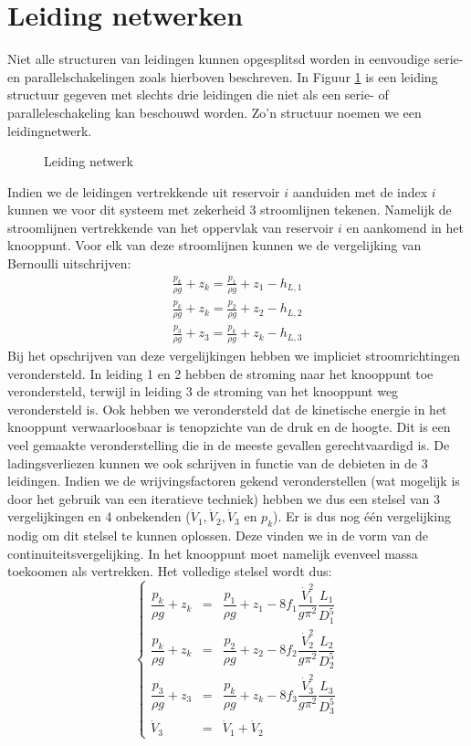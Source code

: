 	\FloatBarrier
	\section{Leiding netwerken}
	\label{sec:Leiding netwerken}	
Niet alle structuren van leidingen kunnen opgesplitsd worden in eenvoudige serie- en parallelschakelingen zoals hierboven beschreven. In Figuur \ref{fig:leidingnetwerk} is een leiding structuur gegeven met slechts drie leidingen die niet als een serie- of paralleleschakeling kan beschouwd worden. Zo'n structuur noemen we een leidingnetwerk.
\begin{figure}
	\centering
	
	\caption{Leiding netwerk}
	\label{fig:leidingnetwerk}
\end{figure}
Indien we de leidingen vertrekkende uit reservoir $i$ aanduiden met de index $i$ kunnen we voor dit systeem met zekerheid 3 stroomlijnen tekenen. Namelijk de stroomlijnen vertrekkende van het oppervlak van reservoir $i$ en aankomend in het knooppunt. Voor elk van deze stroomlijnen kunnen we de vergelijking van Bernoulli uitschrijven:
\begin{eqnarray}
	\frac{p_k}{\rho g} + z_k = \frac{p_1}{\rho g} + z_1 - h_{L,1} \nonumber \\
	\frac{p_k}{\rho g} + z_k = \frac{p_2}{\rho g} + z_2 - h_{L,2} \\
	\frac{p_3}{\rho g} + z_3 = \frac{p_k}{\rho g} + z_k - h_{L,3} \nonumber
\end{eqnarray} 
Bij het opschrijven van deze vergelijkingen hebben we impliciet stroomrichtingen verondersteld. In leiding 1 en 2 hebben de stroming naar het knooppunt toe verondersteld, terwijl in leiding 3 de stroming van het knooppunt weg verondersteld is. Ook hebben we verondersteld dat de kinetische energie in het knooppunt verwaarloosbaar is tenopzichte van de druk en de hoogte. Dit is een veel gemaakte veronderstelling die in de meeste gevallen gerechtvaardigd is. De ladingsverliezen kunnen we ook schrijven in functie van de debieten in de 3 leidingen. Indien we de wrijvingsfactoren gekend veronderstellen (wat mogelijk is door het gebruik van een iteratieve techniek) hebben we dus een stelsel van 3 vergelijkingen en 4 onbekenden ($\dot{V}_1,\dot{V}_2,\dot{V}_3$ en $p_k$). Er is dus nog \'e\'en vergelijking nodig om dit stelsel te kunnen oplossen. Deze vinden we in de vorm van de continuiteitsvergelijking. In het knooppunt moet namelijk evenveel massa toekoomen als vertrekken. Het volledige stelsel wordt dus:
\begin{equation}
	\left\{
	\begin{array}{lcl}
		\dfrac{p_k}{\rho g} + z_k &=& \dfrac{p_1}{\rho g} + z_1 - 8 f_1 \dfrac{\dot{V}_1^2}{g \pi^2} \dfrac{L_1}{D_1^5} \\
		\dfrac{p_k}{\rho g} + z_k &=& \dfrac{p_2}{\rho g} + z_2 - 8 f_2 \dfrac{\dot{V}_2^2}{g \pi^2} \dfrac{L_2}{D_2^5} \\
		\dfrac{p_3}{\rho g} + z_3 &=& \dfrac{p_k}{\rho g} + z_k - 8 f_3 \dfrac{\dot{V}_3^2}{g \pi^2} \dfrac{L_3}{D_3^5} \\
		\dot{V}_3 &=& \dot{V}_1 + \dot{V}_2
	\end{array}
	\right.
\end{equation}
